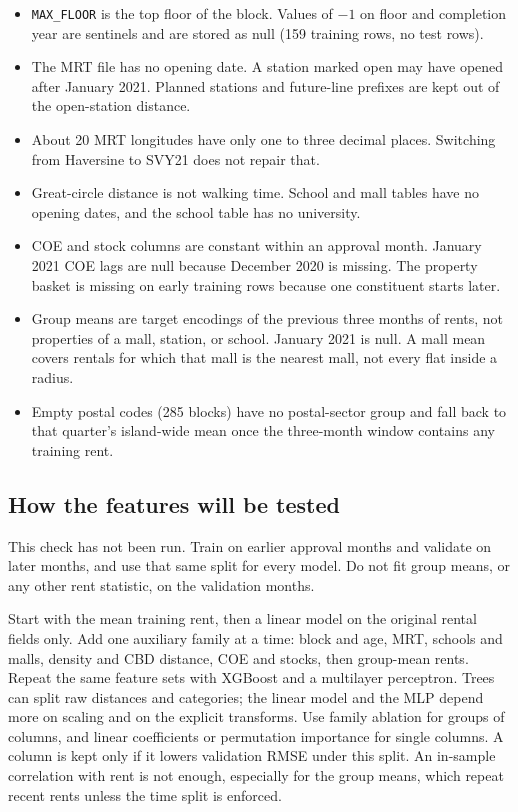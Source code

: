 \documentclass[11pt]{article}
\begin{document}
\begin{itemize}
\item \texttt{MAX\_FLOOR} is the top floor of the block. Values of $-1$ on floor and completion year are sentinels and are stored as null (159 training rows, no test rows).
\item The MRT file has no opening date. A station marked open may have opened after January 2021. Planned stations and future-line prefixes are kept out of the open-station distance.
\item About 20 MRT longitudes have only one to three decimal places. Switching from Haversine to SVY21 does not repair that.
\item Great-circle distance is not walking time. School and mall tables have no opening dates, and the school table has no university.
\item COE and stock columns are constant within an approval month. January 2021 COE lags are null because December 2020 is missing. The property basket is missing on early training rows because one constituent starts later.
\item Group means are target encodings of the previous three months of rents, not properties of a mall, station, or school. January 2021 is null. A mall mean covers rentals for which that mall is the nearest mall, not every flat inside a radius.
\item Empty postal codes (285 blocks) have no postal-sector group and fall back to that quarter's island-wide mean once the three-month window contains any training rent.
\end{itemize}

\subsection{How the features will be tested}

This check has not been run.
Train on earlier approval months and validate on later months, and use that same split for every model.
Do not fit group means, or any other rent statistic, on the validation months.

Start with the mean training rent, then a linear model on the original rental fields only.
Add one auxiliary family at a time: block and age, MRT, schools and malls, density and CBD distance, COE and stocks, then group-mean rents.
Repeat the same feature sets with XGBoost and a multilayer perceptron.
Trees can split raw distances and categories; the linear model and the MLP depend more on scaling and on the explicit transforms.
Use family ablation for groups of columns, and linear coefficients or permutation importance for single columns.
A column is kept only if it lowers validation RMSE under this split.
An in-sample correlation with rent is not enough, especially for the group means, which repeat recent rents unless the time split is enforced.
\end{document}
